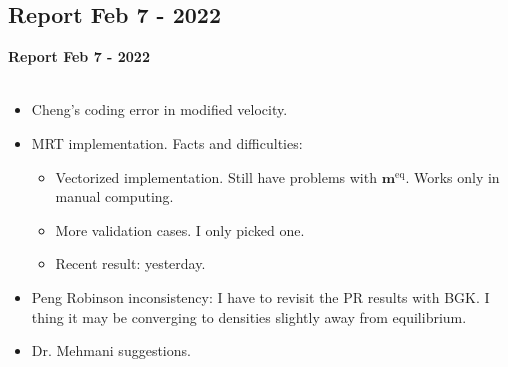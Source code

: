 \documentclass{beamer}
\begin{document}
	\subsection{Report Feb 7 - 2022}
	\label{}
	\justifying
	\begin{frame}
		\textbf{Report Feb 7 - 2022}\\~\\
		\begin{itemize}
			\item Cheng's coding error in modified velocity.
			\item MRT implementation. Facts and difficulties:
			\begin{itemize}
				\item Vectorized implementation. Still have problems with $\mathbf{m}^{\text{eq}}$. Works only in manual computing.
				\item More validation cases. I only picked one.
				\item Recent result: yesterday.
			\end{itemize}
			\item Peng Robinson inconsistency: I have to revisit the PR results with BGK. I thing it may be converging to densities slightly away from equilibrium.
			\item Dr. Mehmani suggestions.
			
		\end{itemize}
	\end{frame}
	
\end{document}
